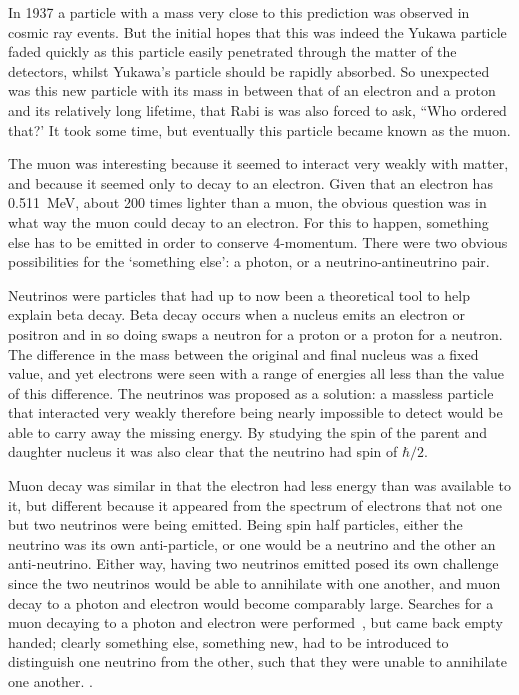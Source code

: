 In 1937 a particle with a mass very close to this prediction was observed in cosmic ray events.
But the initial hopes that this was indeed the Yukawa particle faded quickly as this particle easily penetrated through the matter of the detectors, whilst Yukawa's particle should be rapidly absorbed.
So unexpected was this new particle with its mass in between that of an electron and a proton and its relatively long lifetime, that Rabi is was also forced to ask, ``Who ordered that?'
It took some time, but eventually this particle became known as the muon.

The muon was interesting because it seemed to interact very weakly with matter, and because it seemed only to decay to an electron.
Given that an electron has 0.511~MeV, about 200 times lighter than a muon, the obvious question was in what way the muon could decay to an electron.
For this to happen, something else has to be emitted in order to conserve 4-momentum.
There were two obvious possibilities for the `something else': a photon, or a neutrino-antineutrino pair.

Neutrinos were particles that had up to now been a theoretical tool to help explain beta decay.
Beta decay occurs when a nucleus emits an electron or positron and in so doing swaps a neutron for a proton or a proton for a neutron.
The difference in the mass between the original and final nucleus was a fixed value, and yet electrons were seen with a range of energies all less than the value of this difference.
The neutrinos was proposed as a solution: a massless particle that interacted very weakly therefore being nearly impossible to detect would be able to carry away the missing energy.
By studying the spin of the parent and daughter nucleus it was also clear that the neutrino had spin of $\hbar/2$.


Muon decay was similar in that the electron had less energy than was available to it, but different because it appeared from the spectrum of electrons that not one but two neutrinos were being emitted.
Being spin half particles, either the neutrino was its own anti-particle, or one would be a neutrino and the other an anti-neutrino.
Either way, having two neutrinos emitted posed its own challenge since the two neutrinos would be able to annihilate with one another, and muon decay to a photon and electron would become comparably large.
Searches for a muon decaying to a photon and electron were performed~\cite{}, but came back empty handed;
clearly something else, something new, had to be introduced to distinguish one neutrino from the other, such that they were unable to annihilate one another.
.

